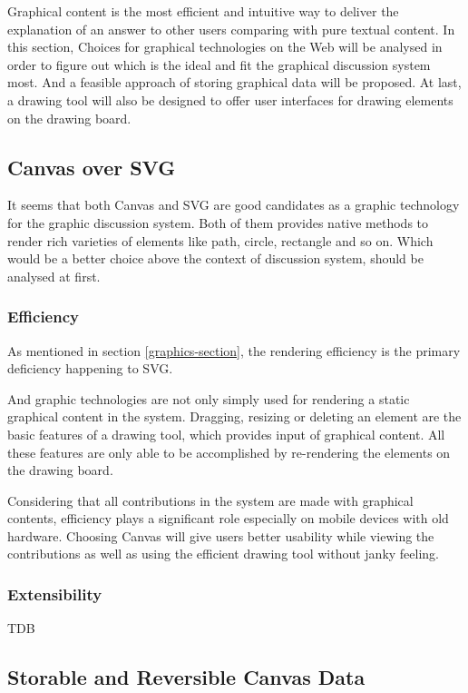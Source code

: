 
Graphical content is the most efficient and intuitive way to deliver the explanation of an answer to other users comparing with pure textual content. In this section, Choices for graphical technologies on the Web will be analysed in order to figure out which is the ideal and fit the graphical discussion system most. And a feasible approach of storing graphical data will be proposed. At last, a drawing tool will also be designed to offer user interfaces for drawing elements on the drawing board.

\subsection{Canvas over SVG}
It seems that both Canvas and SVG are good candidates as a graphic technology for the graphic discussion system. Both of them provides native methods to render rich varieties of elements like path, circle, rectangle and so on. Which would be a better choice above the context of discussion system, should be analysed at first.

\subsubsection{Efficiency}
As mentioned in section \ref{graphics-section}, the rendering efficiency is the primary deficiency happening to SVG. 

And graphic technologies are not only simply used for rendering a static graphical content in the system. Dragging, resizing or deleting an element are the basic features of a drawing tool, which provides input of graphical content. All these features are only able to be accomplished by re-rendering the elements on the drawing board. 

Considering that all contributions in the system are made with graphical contents, efficiency plays a significant role especially on mobile devices with old hardware. Choosing Canvas will give users better usability while viewing the contributions as well as using the efficient drawing tool without janky feeling. 

\subsubsection{Extensibility}
TDB

\subsection{Storable and Reversible Canvas Data }

